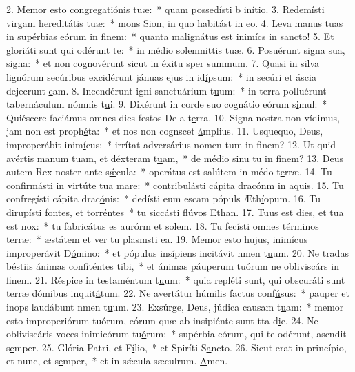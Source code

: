2. Memor esto congregatiónis t\uline{u}æ:~* quam possedísti b in\uline{í}tio.
3. Redemísti virgam hereditátis t\uline{u}æ:~* mons Sion, in quo habitást in \uline{e}o.
4. Leva manus tuas in supérbias eórum in f\uline{i}nem:~* quanta malignátus est inimícs in s\uline{a}ncto!
5. Et gloriáti sunt qui od\uline{é}runt te:~* in médio solemnittis t\uline{u}æ.
6. Posuérunt signa sua, s\uline{i}gna:~* et non cognovérunt sicut in éxitu sper s\uline{u}mmum.
7. Quasi in silva lignórum secúribus excidérunt jánuas ejus in id\uline{í}psum:~* in secúri et áscia dejecrunt \uline{e}am.
8. Incendérunt igni sanctuárium t\uline{u}um:~* in terra polluérunt tabernáculum nómnis t\uline{u}i.
9. Dixérunt in corde suo cognátio eórum s\uline{i}mul:~* Quiéscere faciámus omnes dies festos De a t\uline{e}rra.
10. Signa nostra non vídimus, jam non est proph\uline{é}ta:~* et nos non cognscet \uline{á}mplius.
11. Usquequo, Deus, improperábit inim\uline{í}cus:~* irrítat adversárius nomen tum in f\uline{i}nem?
12. Ut quid avértis manum tuam, et déxteram t\uline{u}am,~* de médio sinu tu in f\uline{i}nem?
13. Deus autem Rex noster ante s\uline{ǽ}cula:~* operátus est salútem in médo t\uline{e}rræ.
14. Tu confirmásti in virtúte tua m\uline{a}re:~* contribulásti cápita dracónm in \uline{a}quis.
15. Tu confregísti cápita drac\uline{ó}nis:~* dedísti eum escam pópuls Æth\uline{í}opum.
16. Tu dirupísti fontes, et torr\uline{é}ntes~* tu siccásti flúvos \uline{E}than.
17. Tuus est dies, et tua \uline{e}st nox:~* tu fabricátus es aurórm et s\uline{o}lem.
18. Tu fecísti omnes términos t\uline{e}rræ:~* æstátem et ver tu plasmsti \uline{e}a.
19. Memor esto hujus, inimícus improperávit D\uline{ó}mino:~* et pópulus insípiens incitávit nmen t\uline{u}um.
20. Ne tradas béstiis ánimas confiténtes t\uline{i}bi,~* et ánimas páuperum tuórum ne obliviscárs in f\uline{i}nem.
21. Réspice in testaméntum t\uline{u}um:~* quia repléti sunt, qui obscuráti sunt terræ dómibus inquit\uline{á}tum.
22. Ne avertátur húmilis factus conf\uline{ú}sus:~* pauper et inops laudábunt nmen t\uline{u}um.
23. Exsúrge, Deus, júdica causam t\uline{u}am:~* memor esto improperiórum tuórum, eórum quæ ab insipiénte sunt tta d\uline{i}e.
24. Ne obliviscáris voces inimicórum tu\uline{ó}rum:~* supérbia eórum, qui te odérunt, ascndit s\uline{e}mper.
25. Glória Patri, et F\uline{í}lio,~* et Spiríti S\uline{a}ncto.
26. Sicut erat in princípio, et nunc, et s\uline{e}mper,~* et in sǽcula sæculrum. \uline{A}men.
